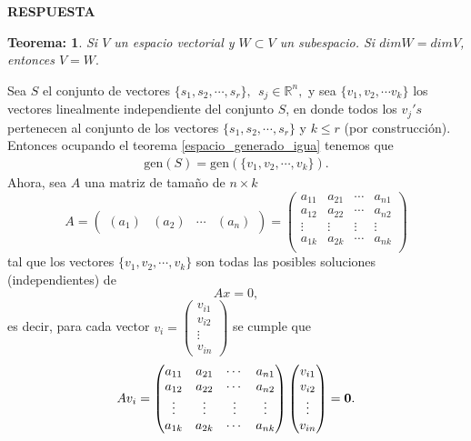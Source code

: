\documentclass[11pt,letterpaper]{article}
\newcommand{\mR}{\mathbb{R}}
\newcommand{\res}{\textbf{RESPUESTA}\\}
\newcommand{\gen}{\text{gen}}
\newtheorem{thmt}{Teorema:}
\begin{document}
\begin{enumerate}
\res 
\begin{framed}
    \begin{thmt} \label{subespacio_dimension}
	Si $V$ un espacio vectorial y $W\subset V$ un subespacio. Si $dim W=dim V$, entonces $V=W.$
    \end{thmt}
\end{framed}
Sea $S$ el conjunto de vectores $\{s_1,s_2,\cdots ,s_r\},\  \ s_j\in \mR^n,$ y sea $\{v_{1}, v_{2}, \cdots v_k \}$ los vectores linealmente independiente del conjunto $S$, en donde  todos los $v_j's$ pertenecen al conjunto de los vectores $\{s_1,s_2,\cdots ,s_r\}$ y $k\leq r$ (por construcción). Entonces ocupando el teorema  \ref{espacio_generado_igua} tenemos que 
\begin{align}\label{generado}
\gen(S)=\gen(\{v_{1}, v_{2}, \cdots, v_k \}).
\end{align}
Ahora, sea $A$ una matriz de tamaño de $n\times k$ 
$$A=\begin{pmatrix}
(a_1)&(a_2)&\cdots&(a_n)
\end{pmatrix}=\begin{pmatrix}
a_{11}&a_{21}&\cdots&a_{n1}\\
a_{12}&a_{22}&\cdots&a_{n2}\\
\vdots&\vdots&\vdots&\vdots\\
a_{1k}&a_{2k}&\cdots&a_{nk}\\
\end{pmatrix}$$
 tal que los vectores $\{v_{1}, v_{2}, \cdots, v_k \}$ son todas las posibles soluciones (independientes) de 
$$Ax=0,$$
es decir, para cada vector $v_i=\begin{pmatrix}
v_{i1}\\
v_{i2}\\
\vdots\\
v_{in}
\end{pmatrix}$ se cumple que 
\begin{align*}
Av_i=\begin{pmatrix}
a_{11}&a_{21}&\cdots&a_{n1}\\
a_{12}&a_{22}&\cdots&a_{n2}\\
\vdots&\vdots&\vdots&\vdots\\
a_{1k}&a_{2k}&\cdots&a_{nk}\\
\end{pmatrix}\begin{pmatrix}
v_{i1}\\
v_{i2}\\
\vdots\\
v_{in}
\end{pmatrix}=\bf 0.

\end{align*}
\end{enumerate}
\end{document}
